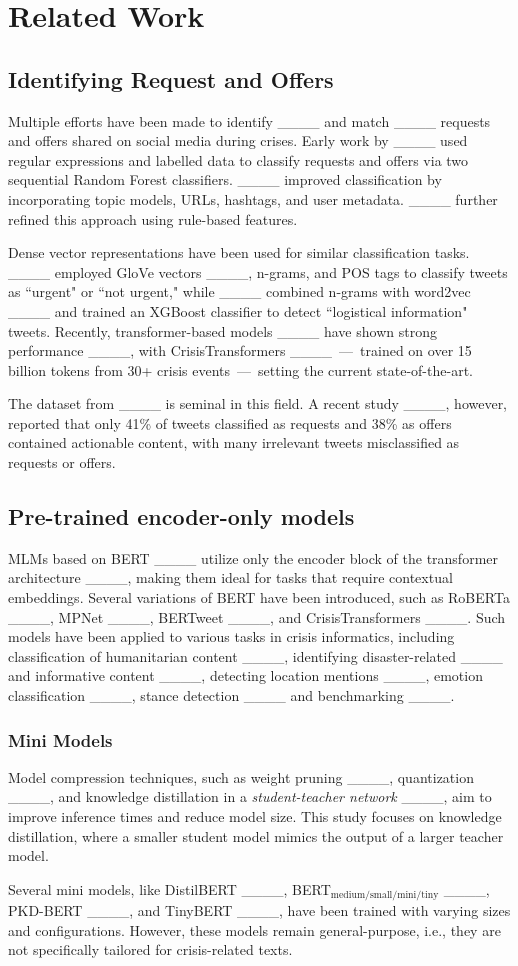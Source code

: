 \section{Related Work}
\subsection{Identifying Request and Offers}
Multiple efforts have been made to identify ____ and match ____ requests and offers shared on social media during crises. Early work by ____ used regular expressions and labelled data to classify requests and offers via two sequential Random Forest classifiers. ____ improved classification by incorporating topic models, URLs, hashtags, and user metadata. ____ further refined this approach using rule-based features.

Dense vector representations have been used for similar classification tasks. ____ employed GloVe vectors ____, n-grams, and POS tags to classify tweets as ``urgent" or ``not urgent," while ____ combined n-grams with word2vec ____ and trained an XGBoost classifier to detect ``logistical information" tweets. Recently, transformer-based models ____ have shown strong performance ____, with CrisisTransformers ____~---~trained on over 15 billion tokens from 30+ crisis events~---~setting the current state-of-the-art.

The dataset from ____ is seminal in this field. A recent study ____, however, reported that only 41\% of tweets classified as requests and 38\% as offers contained actionable content, with many irrelevant tweets misclassified as requests or offers.



\subsection{Pre-trained encoder-only models}
MLMs based on BERT ____ utilize only the encoder block of the transformer architecture ____, making them ideal for tasks that require contextual embeddings. Several variations of BERT have been introduced, such as RoBERTa ____, MPNet ____, BERTweet ____, and CrisisTransformers ____. Such models have been applied to various tasks in crisis informatics, including classification of humanitarian content ____, identifying disaster-related ____ and informative content ____, detecting location mentions ____, emotion classification ____, stance detection ____ and benchmarking ____.


\subsubsection{Mini Models}
Model compression techniques, such as weight pruning ____, quantization ____, and knowledge distillation in a \textit{student-teacher network} ____, aim to improve inference times and reduce model size. This study focuses on knowledge distillation, where a smaller student model mimics the output of a larger teacher model.

Several mini models, like DistilBERT ____, BERT$_{\text{medium/small/mini/tiny}}$ ____, PKD-BERT ____, and TinyBERT ____, have been trained with varying sizes and configurations. However, these models remain general-purpose, i.e., they are not specifically tailored for crisis-related texts.